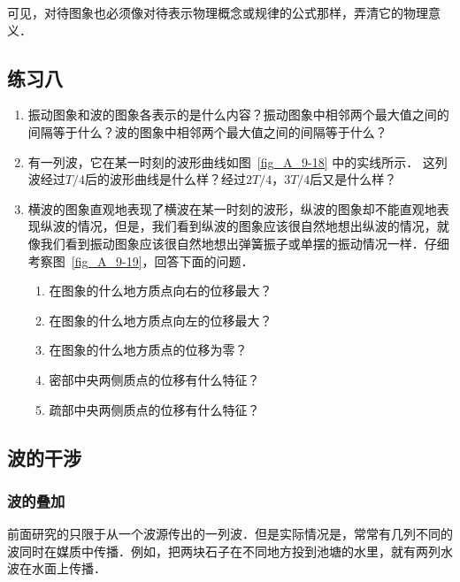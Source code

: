 可见，对待图象也必须像对待表示物理概念或规律的公式那样，弄清它的物理意义．

\subsection*{练习八}
\begin{enumerate}
    \item 振动图象和波的图象各表示的是什么内容？振动图象中相邻两个最大值之间的间隔等于什么？波的图象中相邻两个最大值之间的间隔等于什么？
    \item 有一列波，它在某一时刻的波形曲线如图~\ref{fig_A_9-18} 中的实线所示．
    这列波经过$T/4$后的波形曲线是什么样？经过$2T/4$，$3T/4$后又是什么样？
    \item 横波的图象直观地表现了横波在某一时刻的波形，纵波的图象却不能直观地表现纵波的情况，但是，我们看到纵波的图象应该很自然地想出纵波的情况，就像我们看到振动图象应该很自然地想出弹簧振子或单摆的振动情况一样．仔细考察图~\ref{fig_A_9-19}，回答下面的问题．
    \begin{enumerate}
        \item 在图象的什么地方质点向右的位移最大？
        \item 在图象的什么地方质点向左的位移最大？
        \item 在图象的什么地方质点的位移为零？
        \item 密部中央两侧质点的位移有什么特征？
        \item 疏部中央两侧质点的位移有什么特征？
    \end{enumerate}
\end{enumerate}

\subsection{波的干涉}
\subsubsection{波的叠加} 

前面研究的只限于从一个波源传出的一列波．但是实际情况是，常常有几列不同的波同时在媒质中传播．例如，把两块石子在不同地方投到池塘的水里，就有两列水波在水面上传播．

